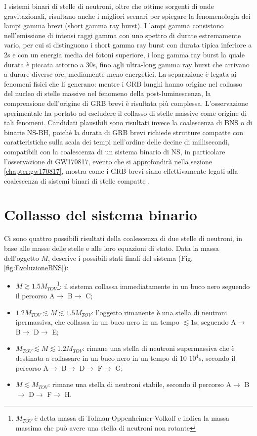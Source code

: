 I sistemi binari di stelle di neutroni, oltre che ottime sorgenti di onde gravitazionali, risultano anche i migliori scenari per spiegare la fenomenologia dei lampi gamma brevi (short gamma ray burst). I lampi gamma consistono nell'emissione di intensi raggi gamma con uno spettro di durate estremamente vario, per cui si distinguono i short gamma ray burst con durata tipica inferiore a 2s e con un energia media dei fotoni superiore, i long gamma ray burst la quale durata è piccata attorno a 30s, fino agli ultra-long gamma ray burst che arrivano a durare diverse ore, mediamente meno energetici. 
La separazione è legata ai fenomeni fisici che li generano: mentre i GRB lunghi hanno origine nel collasso del nucleo di stelle massive nel fenomeno della post-luminescenza, la comprensione dell'origine di GRB brevi è risultata più complessa. L'osservazione sperimentale ha portato ad escludere il collasso di stelle massive come origine di tali fenomeni. Candidati plausibili sono risultati invece la coalescenza di BNS o di binarie NS-BH, poiché la durata di GRB brevi richiede strutture compatte con caratteristiche sulla scala dei tempi nell'ordine delle decine di millisecondi, compatibili con la coalescenza di un sistema binario di NS, in particolare l'osservazione di GW170817, evento che si approfondirà nella sezione \ref{chapter:gw170817}, mostra come i GRB brevi siano effettivamente legati alla coalescenza di sistemi binari di stelle compatte \cite{maggiore2018gravitational}.
\section{Collasso del sistema binario}
\label{section:residual}
Ci sono quattro possibili risultati della coalescenza di due stelle di neutroni, in base alle masse delle stelle e alle loro equazioni di stato. 
Data la massa dell'oggetto $M$, \cite{sarin2020evolution} descrive i possibili stati finali del sistema (Fig.\ref{fig:EvoluzioneBNS}):
\begin{itemize}
	\item $M\gtrsim 1.5 M_{TOV}$\footnote{$M_{TOV}$ è detta massa di Tolman-Oppenheimer-Volkoff e indica la massa massima che può avere una stella di neutroni non rotante}: il sistema collassa immediatamente in un buco nero seguendo il percorso A$\rightarrow$ B$\rightarrow$ C;
\end{itemize}

\begin{itemize}
	\item $1.2 M_{TOV} \lesssim M \lesssim 1.5 M_{TOV}$: l'oggetto rimanente è una stella di neutroni ipermassiva, che collassa in un buco nero in un tempo $\lesssim 1$s, seguendo A$\rightarrow$ B$\rightarrow$ D$\rightarrow$ E;		
	\item $M_{TOV} \lesssim M \lesssim 1.2 M_{TOV}$: rimane una stella di neutroni supermassiva che è destinata a collassare in un buco nero in un tempo di 10 \textdiv $10^4$s, secondo il percorso A$\rightarrow$ B$\rightarrow$ D$\rightarrow$ F$\rightarrow$ G;		\item $M\lesssim M_{TOV}$: rimane una stella di neutroni stabile, secondo il percorso A$\rightarrow$ B$\rightarrow$ D$\rightarrow$ F$\rightarrow$ H.	
\end{itemize}

